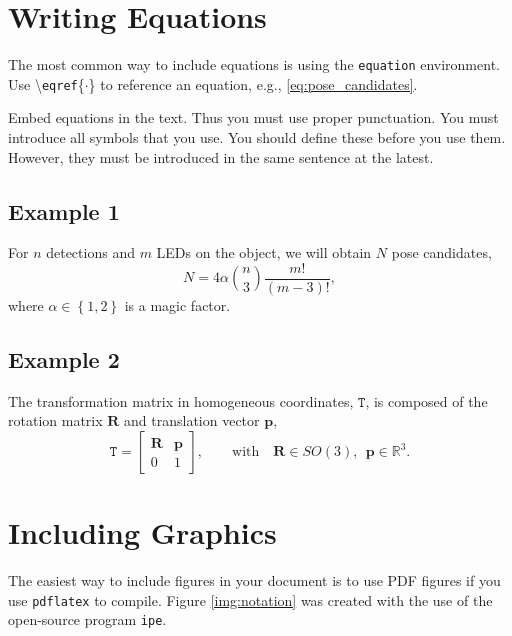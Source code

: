 \section{Writing Equations}\label{sec:math}

The most common way to include equations is using the \texttt{equation} environment.
Use \textbackslash\texttt{eqref}\{$\cdot$\} to reference an equation, e.g., \eqref{eq:pose_candidates}.

Embed equations in the text.
Thus you must use proper punctuation.
You must introduce all symbols that you use.
You should define these before you use them.
However, they must be introduced in the same sentence at the latest. 

\subsection*{Example 1}

For $n$ detections and $m$ LEDs on the object, we will
obtain $N$ pose candidates,
	\begin{equation}\label{eq:pose_candidates}
		N =  4 \alpha \binom{n}{3} \frac{m!}{(m-3)!},
	\end{equation}
where $\alpha \in \left\{ {1, 2}\right\}$ is a magic factor.

\subsection*{Example 2}

The transformation matrix in homogeneous coordinates, $\mathtt{T}$, is composed of the rotation matrix $\mathbf{R}$ and translation vector $\mathbf{p}$,
  \begin{equation}\label{eq:se3}
    \mathtt{T} = \begin{bmatrix}\mathbf{R} & \mathbf{p} \\ 0 & 1\end{bmatrix}, \qquad \text{with} \quad \mathbf{R} \in SO(3), \ \ \mathbf{p} \in \mathbb{R}^3.
  \end{equation}


\section{Including Graphics}\label{sec:epsgraph}

The easiest way to include figures in your document is to use PDF figures if you use \texttt{pdflatex} to compile.
Figure \ref{img:notation} was created with the use of the open-source program \texttt{ipe}.

